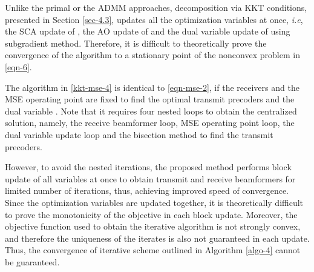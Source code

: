 Unlike the primal or the \ac{ADMM} approaches, decomposition via \ac{KKT} conditions, presented in Section \ref{sec-4.3}, updates all the optimization variables at once, \textit{i.e}, the \ac{SCA} update of , the \ac{AO} update of  and the dual variable update of \me{\alpha} using subgradient method. Therefore, it is difficult to theoretically prove the convergence of the algorithm to a stationary point of the nonconvex problem in \eqref{eqn-6}.

The algorithm in \eqref{kkt-mse-4} is identical to \eqref{eqn-mse-2}, if the receivers  and the \ac{MSE} operating point  are fixed to find the optimal transmit precoders  and the dual variable . Note that it requires four nested loops to obtain the centralized solution, namely, the receive beamformer loop, \ac{MSE} operating point loop, the dual variable update loop and the bisection method to find the transmit precoders. 

However, to avoid the nested iterations, the proposed method performs block update of all variables at once to obtain transmit and receive beamformers for limited number of iterations, thus, achieving improved speed of convergence. Since the optimization variables are updated together, it is theoretically difficult to prove the monotonicity of the objective in each block update. Moreover, the objective function used to obtain the iterative algorithm is not strongly convex, and therefore the uniqueness of the iterates is also not guaranteed in each update. Thus, the convergence of iterative scheme outlined in Algorithm \ref{algo-4} cannot be guaranteed.

